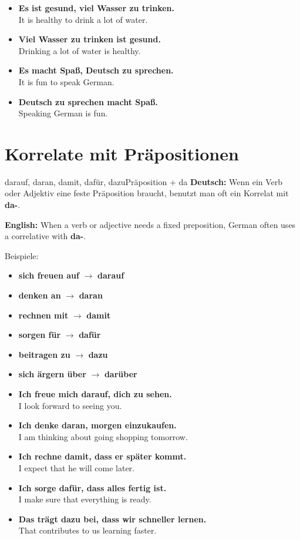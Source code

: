 \documentclass[a4paper,11pt]{article}
\newcommand{\GermanText}[1]{\textbf{Deutsch: }#1\par}
\newcommand{\EnglishText}[1]{{\small\color{SoftGray}\textbf{English: }#1\par}}
\newcommand{\ExampleItem}[2]{\item \textbf{#1}\\{\small\color{SoftGray}#2}}
\begin{document}
        \begin{exbox}
            \begin{itemize}
                \ExampleItem{Es ist gesund, viel Wasser zu trinken.}{It is healthy to drink a lot of water.}
                \ExampleItem{Viel Wasser zu trinken ist gesund.}{Drinking a lot of water is healthy.}
                \ExampleItem{Es macht Spaß, Deutsch zu sprechen.}{It is fun to speak German.}
                \ExampleItem{Deutsch zu sprechen macht Spaß.}{Speaking German is fun.}
            \end{itemize}
        \end{exbox}
    
    
    \section{Korrelate mit Präpositionen}
        
        \begin{grammarentry}{darauf, daran, damit, dafür, dazu}{Präposition + da}
            \GermanText{Wenn ein Verb oder Adjektiv eine feste Präposition braucht, benutzt man oft ein Korrelat mit \textbf{da-}.}
            \EnglishText{When a verb or adjective needs a fixed preposition, German often uses a correlative with \textbf{da-}.}
            
            Beispiele:
            \begin{itemize}
                \item \textbf{sich freuen auf} $\rightarrow$ \textbf{darauf}
                \item \textbf{denken an} $\rightarrow$ \textbf{daran}
                \item \textbf{rechnen mit} $\rightarrow$ \textbf{damit}
                \item \textbf{sorgen für} $\rightarrow$ \textbf{dafür}
                \item \textbf{beitragen zu} $\rightarrow$ \textbf{dazu}
                \item \textbf{sich ärgern über} $\rightarrow$ \textbf{darüber}
            \end{itemize}
        \end{grammarentry}
        
        \begin{exbox}
            \begin{itemize}
                \ExampleItem{Ich freue mich darauf, dich zu sehen.}{I look forward to seeing you.}
                \ExampleItem{Ich denke daran, morgen einzukaufen.}{I am thinking about going shopping tomorrow.}
                \ExampleItem{Ich rechne damit, dass er später kommt.}{I expect that he will come later.}
                \ExampleItem{Ich sorge dafür, dass alles fertig ist.}{I make sure that everything is ready.}
                \ExampleItem{Das trägt dazu bei, dass wir schneller lernen.}{That contributes to us learning faster.}
            \end{itemize}
        \end{exbox}
    
\end{document}
